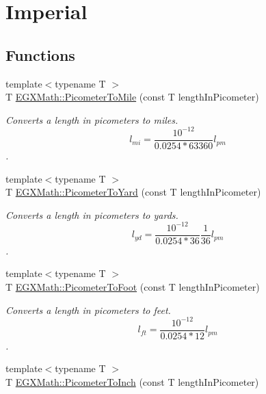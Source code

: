 \hypertarget{group___e_g_x_math-_conversions-_length_conversions-_picometer-_imperial}{}\section{Imperial}
\label{group___e_g_x_math-_conversions-_length_conversions-_picometer-_imperial}
\subsection*{Functions}
\begin{DoxyCompactItemize}
\item 
{\footnotesize template$<$typename T $>$ }\\T \mbox{\hyperlink{group___e_g_x_math-_conversions-_length_conversions-_picometer-_imperial_gae153bd94c8377dd95b8b09bcc56256b0}{E\+G\+X\+Math\+::\+Picometer\+To\+Mile}} (const T length\+In\+Picometer)
\begin{DoxyCompactList}\small\item\em Converts a length in picometers to miles. \[ l_{mi}=\frac{10^{-12}}{0.0254 * 63360} l_{pm} \]. \end{DoxyCompactList}\item 
{\footnotesize template$<$typename T $>$ }\\T \mbox{\hyperlink{group___e_g_x_math-_conversions-_length_conversions-_picometer-_imperial_ga18b17a118ffb1092beefc221f44a97a2}{E\+G\+X\+Math\+::\+Picometer\+To\+Yard}} (const T length\+In\+Picometer)
\begin{DoxyCompactList}\small\item\em Converts a length in picometers to yards. \[ l_{yd}= \frac{10^{-12}}{0.0254 * 36} \frac{1}{36} l_{pm} \]. \end{DoxyCompactList}\item 
{\footnotesize template$<$typename T $>$ }\\T \mbox{\hyperlink{group___e_g_x_math-_conversions-_length_conversions-_picometer-_imperial_gae83808c99fe5c49c54717302f667ff46}{E\+G\+X\+Math\+::\+Picometer\+To\+Foot}} (const T length\+In\+Picometer)
\begin{DoxyCompactList}\small\item\em Converts a length in picometers to feet. \[ l_{ft}= \frac{10^{-12}}{0.0254 * 12} l_{pm} \]. \end{DoxyCompactList}\item 
{\footnotesize template$<$typename T $>$ }\\T \mbox{\hyperlink{group___e_g_x_math-_conversions-_length_conversions-_picometer-_imperial_ga163afd72563986ed456466be07efd3cb}{E\+G\+X\+Math\+::\+Picometer\+To\+Inch}} (const T length\+In\+Picometer)

\end{DoxyCompactItemize}
